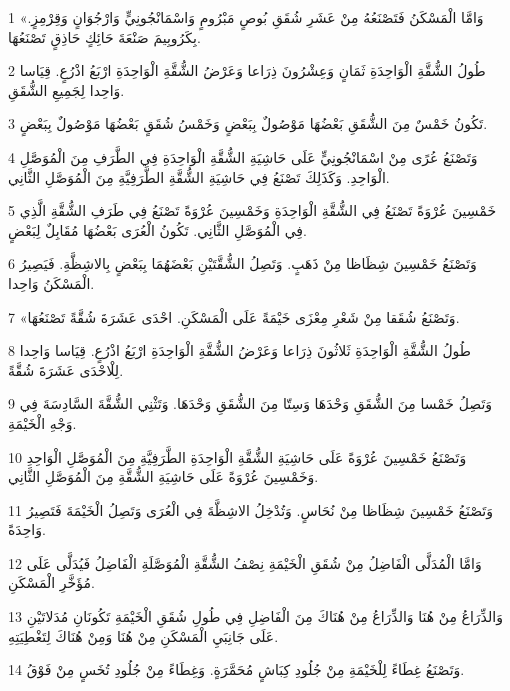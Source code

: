\par 1 «وَامَّا الْمَسْكَنُ فَتَصْنَعُهُ مِنْ عَشَرِ شُقَقِ بُوصٍ مَبْرُومٍ وَاسْمَانْجُونِيٍّ وَارْجُوَانٍ وَقِرْمِزٍ. بِكَرُوبِيمَ صَنْعَةَ حَائِكٍ حَاذِقٍ تَصْنَعُهَا.
\par 2 طُولُ الشُّقَّةِ الْوَاحِدَةِ ثَمَانٍ وَعِشْرُونَ ذِرَاعا وَعَرْضُ الشُّقَّةِ الْوَاحِدَةِ ارْبَعُ اذْرُعٍ. قِيَاسا وَاحِدا لِجَمِيعِ الشُّقَقِ.
\par 3 تَكُونُ خَمْسٌ مِنَ الشُّقَقِ بَعْضُهَا مَوْصُولٌ بِبَعْضٍ وَخَمْسُ شُقَقٍ بَعْضُهَا مَوْصُولٌ بِبَعْضٍ.
\par 4 وَتَصْنَعُ عُرًى مِنْ اسْمَانْجُونِيٍّ عَلَى حَاشِيَةِ الشُّقَّةِ الْوَاحِدَةِ فِي الطَّرَفِ مِنَ الْمُوَصَّلِ الْوَاحِدِ. وَكَذَلِكَ تَصْنَعُ فِي حَاشِيَةِ الشُّقَّةِ الطَّرَفِيَّةِ مِنَ الْمُوَصَّلِ الثَّانِي.
\par 5 خَمْسِينَ عُرْوَةً تَصْنَعُ فِي الشُّقَّةِ الْوَاحِدَةِ وَخَمْسِينَ عُرْوَةً تَصْنَعُ فِي طَرَفِ الشُّقَّةِ الَّذِي فِي الْمُوَصَّلِ الثَّانِي. تَكُونُ الْعُرَى بَعْضُهَا مُقَابِلٌ لِبَعْضٍ.
\par 6 وَتَصْنَعُ خَمْسِينَ شِظَاظا مِنْ ذَهَبٍ. وَتَصِلُ الشُّقَّتَيْنِ بَعْضَهُمَا بِبَعْضٍ بِالاشِظَّةِ. فَيَصِيرُ الْمَسْكَنُ وَاحِدا.
\par 7 «وَتَصْنَعُ شُقَقا مِنْ شَعْرِ مِعْزَى خَيْمَةً عَلَى الْمَسْكَنِ. احْدَى عَشَرَةَ شُقَّةً تَصْنَعُهَا.
\par 8 طُولُ الشُّقَّةِ الْوَاحِدَةِ ثَلاثُونَ ذِرَاعا وَعَرْضُ الشُّقَّةِ الْوَاحِدَةِ ارْبَعُ اذْرُعٍ. قِيَاسا وَاحِدا لِلْاحْدَى عَشَرَةَ شُقَّةً.
\par 9 وَتَصِلُ خَمْسا مِنَ الشُّقَقِ وَحْدَهَا وَسِتّا مِنَ الشُّقَقِ وَحْدَهَا. وَتَثْنِي الشُّقَّةَ السَّادِسَةَ فِي وَجْهِ الْخَيْمَةِ.
\par 10 وَتَصْنَعُ خَمْسِينَ عُرْوَةً عَلَى حَاشِيَةِ الشُّقَّةِ الْوَاحِدَةِ الطَّرَفِيَّةِ مِنَ الْمُوَصَّلِ الْوَاحِدِ وَخَمْسِينَ عُرْوَةً عَلَى حَاشِيَةِ الشُّقَّةِ مِنَ الْمُوَصَّلِ الثَّانِي.
\par 11 وَتَصْنَعُ خَمْسِينَ شِظَاظا مِنْ نُحَاسٍ. وَتُدْخِلُ الاشِظَّةَ فِي الْعُرَى وَتَصِلُ الْخَيْمَةَ فَتَصِيرُ وَاحِدَةً.
\par 12 وَامَّا الْمُدَلَّى الْفَاضِلُ مِنْ شُقَقِ الْخَيْمَةِ نِصْفُ الشُّقَّةِ الْمُوَصَّلَةِ الْفَاضِلُ فَيُدَلَّى عَلَى مُؤَخَّرِ الْمَسْكَنِ.
\par 13 وَالذِّرَاعُ مِنْ هُنَا وَالذِّرَاعُ مِنْ هُنَاكَ مِنَ الْفَاضِلِ فِي طُولِ شُقَقِ الْخَيْمَةِ تَكُونَانِ مُدَلاتَيْنِ عَلَى جَانِبَيِ الْمَسْكَنِ مِنْ هُنَا وَمِنْ هُنَاكَ لِتَغْطِيَتِهِ.
\par 14 وَتَصْنَعُ غِطَاءً لِلْخَيْمَةِ مِنْ جُلُودِ كِبَاشٍ مُحَمَّرَةٍ. وَغِطَاءً مِنْ جُلُودِ تُخَسٍ مِنْ فَوْقُ.
